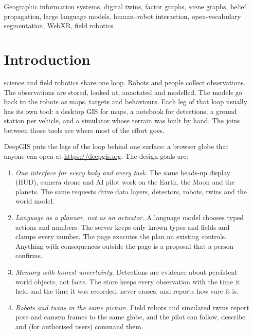 \documentclass[journal]{IEEEtran}
\begin{document}
\begin{IEEEkeywords}
Geographic information systems, digital twins, factor graphs, scene graphs, belief propagation,
large language models, human--robot interaction, open-vocabulary segmentation, WebXR, field robotics
\end{IEEEkeywords}

\section{Introduction}
\label{sec:intro}

 science and field robotics share one loop. Robots and people collect
observations. The observations are stored, looked at, annotated and modelled. The models go back
to the robots as maps, targets and behaviours. Each leg of that loop usually has its own tool:
a desktop GIS for maps, a notebook for detections, a ground station per vehicle, and a simulator
whose terrain was built by hand. The joins between those tools are where most of the effort goes.

DeepGIS puts the legs of the loop behind one surface: a browser globe that anyone can open at
\url{https://deepgis.org}. The design goals are:
\begin{enumerate}
\item \emph{One interface for every body and every task.} The same heads-up display (HUD), camera
drone and AI pilot work on the Earth, the Moon and the planets. The same requests drive data
layers, detectors, robots, twins and the world model.
\item \emph{Language as a planner, not as an actuator.} A language model chooses typed actions and
numbers. The server keeps only known types and fields and clamps every number. The page executes
the plan on existing controls. Anything with consequences outside the page is a proposal that
a person confirms.
\item \emph{Memory with honest uncertainty.} Detections are evidence about persistent world
objects, not facts. The store keeps every observation with the time it held and the time it was
recorded, never erases, and reports how sure it is.
\item \emph{Robots and twins in the same picture.} Field robots and simulated twins report pose and
camera frames to the same globe, and the pilot can follow, describe and (for authorised users)
command them.
\end{enumerate}
\end{document}

